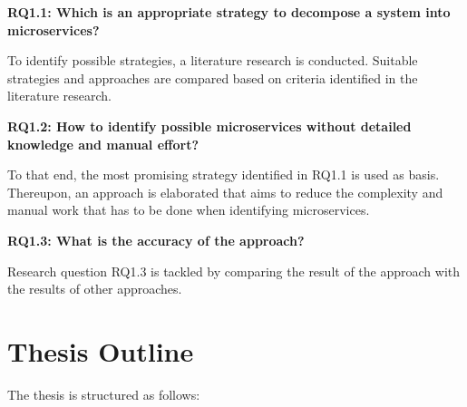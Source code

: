 \leftskip=1.5cm
\rightskip=1cm

\vspace{0.5cm}
\noindent
\textbf{RQ1.1: Which is an appropriate strategy to decompose a system into microservices?}

\vspace{0.2cm}
\noindent
To identify possible strategies, a literature research is conducted. Suitable strategies and approaches are compared based on criteria identified in the literature research.
\vspace{0.5cm}

\noindent
\textbf{RQ1.2: How to identify possible microservices without detailed knowledge and manual effort?}

\vspace{0.2cm}
\noindent
To that end, the most promising strategy identified in RQ1.1 is used as basis. Thereupon, an approach is elaborated that aims to reduce the complexity and manual work that has to be done when identifying microservices.
\vspace{0.5cm}


\noindent
\textbf{RQ1.3: What is the accuracy of the approach?   }

\vspace{0.2cm}
\noindent
Research question RQ1.3 is tackled by comparing the result of the approach with the results of other approaches.

\endgroup


\section{Thesis Outline}
\label{sec_Introduction:ThesisOutline}
The thesis is structured as follows:


